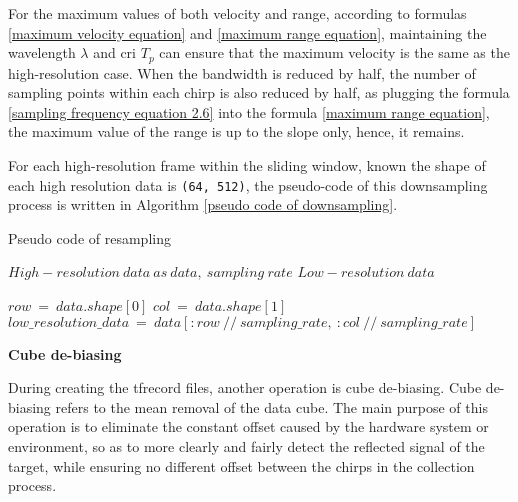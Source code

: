 For the maximum values of both velocity and range, according to formulas \ref{maximum velocity equation} and \ref{maximum range equation}, maintaining the wavelength $\lambda$ and \gls{cri} $T_p$ can ensure that the maximum velocity is the same as the high-resolution case. When the bandwidth is reduced by half, the number of sampling points within each chirp is also reduced by half, as plugging the formula \ref{sampling frequency equation 2.6} into the formula \ref{maximum range equation}, the maximum value of the range is up to the slope only, hence, it remains.

For each high-resolution frame within the sliding window, known the shape of each high resolution data is \texttt{(64, 512)}, the pseudo-code of this downsampling process is written in Algorithm \ref{pseudo code of downsampling}.
\begin{algorithm}
    \caption{Pseudo code of resampling}
    \label{pseudo code of downsampling}
    \renewcommand{\algorithmicrequire}{\textbf{Input:}}
    \renewcommand{\algorithmicensure}{\textbf{Output:}}
    
    \begin{algorithmic}[1]
        \REQUIRE $High-resolution\ data\ as\ data,\ sampling\ rate$
        \ENSURE $Low-resolution\ data$

        \STATE $row\ =\ data.shape[0]$
        \STATE $col\ =\ data.shape[1]$
        \STATE $low\_resolution\_data\ =\ data[:row\ //\ sampling\_rate,\ :col\ //\ sampling\_rate]$
        
    \end{algorithmic}
\end{algorithm}

\begin{spacing}{1.5}
\textbf{\large{Cube de-biasing}}
\end{spacing}

During creating the \gls{tfrecord} files, another operation is cube de-biasing. Cube de-biasing refers to the mean removal of the data cube. The main purpose of this operation is to eliminate the constant offset caused by the hardware system or environment, so as to more clearly and fairly detect the reflected signal of the target, while ensuring no different offset between the chirps in the collection process.

